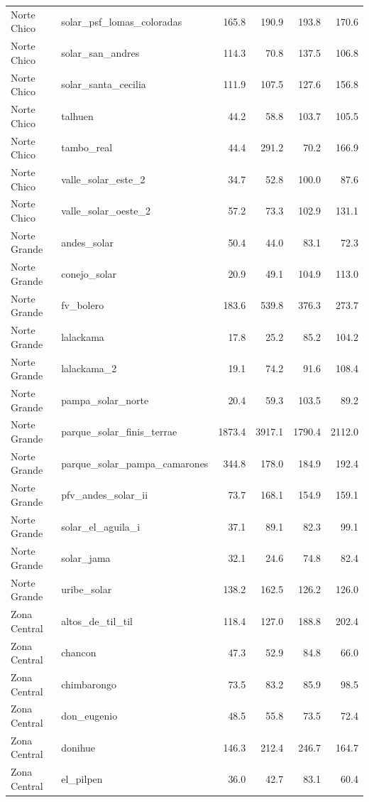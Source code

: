 {\begin{longtable}{llrrrr}
Norte Chico & solar\_psf\_lomas\_coloradas & 165.8 & 190.9 & 193.8 & 170.6 \\
Norte Chico & solar\_san\_andres & 114.3 & 70.8 & 137.5 & 106.8 \\
Norte Chico & solar\_santa\_cecilia & 111.9 & 107.5 & 127.6 & 156.8 \\
Norte Chico & talhuen & 44.2 & 58.8 & 103.7 & 105.5 \\
Norte Chico & tambo\_real & 44.4 & 291.2 & 70.2 & 166.9 \\
Norte Chico & valle\_solar\_este\_2 & 34.7 & 52.8 & 100.0 & 87.6 \\
Norte Chico & valle\_solar\_oeste\_2 & 57.2 & 73.3 & 102.9 & 131.1 \\
Norte Grande & andes\_solar & 50.4 & 44.0 & 83.1 & 72.3 \\
Norte Grande & conejo\_solar & 20.9 & 49.1 & 104.9 & 113.0 \\
Norte Grande & fv\_bolero & 183.6 & 539.8 & 376.3 & 273.7 \\
Norte Grande & lalackama & 17.8 & 25.2 & 85.2 & 104.2 \\
Norte Grande & lalackama\_2 & 19.1 & 74.2 & 91.6 & 108.4 \\
Norte Grande & pampa\_solar\_norte & 20.4 & 59.3 & 103.5 & 89.2 \\
Norte Grande & parque\_solar\_finis\_terrae & 1873.4 & 3917.1 & 1790.4 & 2112.0 \\
Norte Grande & parque\_solar\_pampa\_camarones & 344.8 & 178.0 & 184.9 & 192.4 \\
Norte Grande & pfv\_andes\_solar\_ii & 73.7 & 168.1 & 154.9 & 159.1 \\
Norte Grande & solar\_el\_aguila\_i & 37.1 & 89.1 & 82.3 & 99.1 \\
Norte Grande & solar\_jama & 32.1 & 24.6 & 74.8 & 82.4 \\
Norte Grande & uribe\_solar & 138.2 & 162.5 & 126.2 & 126.0 \\
Zona Central & altos\_de\_til\_til & 118.4 & 127.0 & 188.8 & 202.4 \\
Zona Central & chancon & 47.3 & 52.9 & 84.8 & 66.0 \\
Zona Central & chimbarongo & 73.5 & 83.2 & 85.9 & 98.5 \\
Zona Central & don\_eugenio & 48.5 & 55.8 & 73.5 & 72.4 \\
Zona Central & donihue & 146.3 & 212.4 & 246.7 & 164.7 \\
Zona Central & el\_pilpen & 36.0 & 42.7 & 83.1 & 60.4 \\

\end{longtable}}

